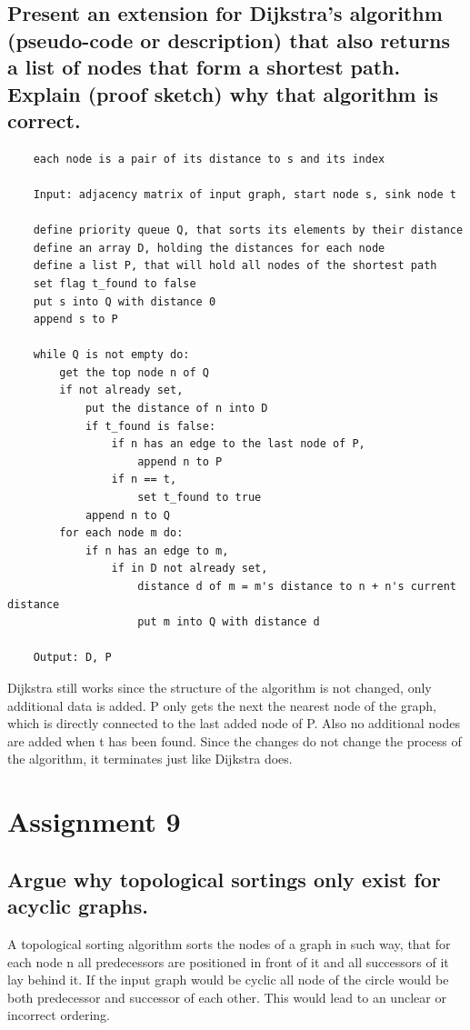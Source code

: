 \documentclass[runningheads]{llncs}
\begin{document}
\subsection*{Present an extension for Dijkstra's algorithm (pseudo-code or description) that also returns a list of nodes that form a shortest path. Explain (proof sketch) why that algorithm is correct.}
\begin{verbatim}
    each node is a pair of its distance to s and its index 

    Input: adjacency matrix of input graph, start node s, sink node t

    define priority queue Q, that sorts its elements by their distance
    define an array D, holding the distances for each node
    define a list P, that will hold all nodes of the shortest path
    set flag t_found to false
    put s into Q with distance 0
    append s to P

    while Q is not empty do:
        get the top node n of Q
        if not already set,
            put the distance of n into D
            if t_found is false: 
                if n has an edge to the last node of P,
                    append n to P
                if n == t, 
                    set t_found to true
            append n to Q
        for each node m do:
            if n has an edge to m,
                if in D not already set,
                    distance d of m = m's distance to n + n's current distance
                    put m into Q with distance d
                    
    Output: D, P
\end{verbatim}

Dijkstra still works since the structure of the algorithm is not changed, only additional data is added. P only
gets the next the nearest node of the graph, which is directly connected to the last added node of P. Also no additional
nodes are added when t has been found. Since the changes do not change the process of the algorithm, it terminates just
like Dijkstra does.

\section*{Assignment 9}

\subsection*{Argue why topological sortings only exist for acyclic graphs.}
A topological sorting algorithm sorts the nodes of a graph in such way, that for each node n all predecessors are positioned in front of it and
all successors of it lay behind it. If the input graph would be cyclic all node of the circle would be both predecessor and successor of each other.
This would lead to an unclear or incorrect ordering.
\end{document}
